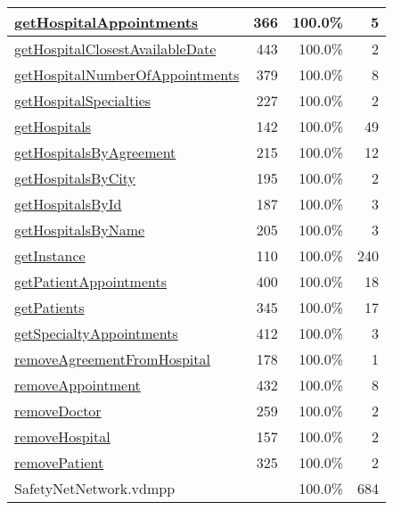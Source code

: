 \begin{longtable}{|l|r|r|r|}
\hline
\hyperref[getHospitalAppointments:366]{getHospitalAppointments} & 366&100.0\% & 5 \\
\hline
\hyperref[getHospitalClosestAvailableDate:443]{getHospitalClosestAvailableDate} & 443&100.0\% & 2 \\
\hline
\hyperref[getHospitalNumberOfAppointments:379]{getHospitalNumberOfAppointments} & 379&100.0\% & 8 \\
\hline
\hyperref[getHospitalSpecialties:227]{getHospitalSpecialties} & 227&100.0\% & 2 \\
\hline
\hyperref[getHospitals:142]{getHospitals} & 142&100.0\% & 49 \\
\hline
\hyperref[getHospitalsByAgreement:215]{getHospitalsByAgreement} & 215&100.0\% & 12 \\
\hline
\hyperref[getHospitalsByCity:195]{getHospitalsByCity} & 195&100.0\% & 2 \\
\hline
\hyperref[getHospitalsById:187]{getHospitalsById} & 187&100.0\% & 3 \\
\hline
\hyperref[getHospitalsByName:205]{getHospitalsByName} & 205&100.0\% & 3 \\
\hline
\hyperref[getInstance:110]{getInstance} & 110&100.0\% & 240 \\
\hline
\hyperref[getPatientAppointments:400]{getPatientAppointments} & 400&100.0\% & 18 \\
\hline
\hyperref[getPatients:345]{getPatients} & 345&100.0\% & 17 \\
\hline
\hyperref[getSpecialtyAppointments:412]{getSpecialtyAppointments} & 412&100.0\% & 3 \\
\hline
\hyperref[removeAgreementFromHospital:178]{removeAgreementFromHospital} & 178&100.0\% & 1 \\
\hline
\hyperref[removeAppointment:432]{removeAppointment} & 432&100.0\% & 8 \\
\hline
\hyperref[removeDoctor:259]{removeDoctor} & 259&100.0\% & 2 \\
\hline
\hyperref[removeHospital:157]{removeHospital} & 157&100.0\% & 2 \\
\hline
\hyperref[removePatient:325]{removePatient} & 325&100.0\% & 2 \\
\hline
\hline
SafetyNetNetwork.vdmpp & & 100.0\% & 684 \\
\hline
\end{longtable}

